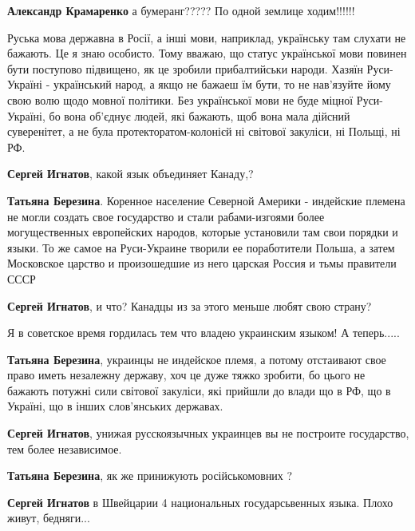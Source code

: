 \begin{itemize}
{\begin{itemize}
\textbf{Александр Крамаренко} а бумеранг????? По одной землице ходим!!!!!!

\end{itemize}


Руська мова державна в Росії, а інші мови, наприклад, українську там слухати не
бажають. Це я знаю особисто. Тому вважаю, що статус української мови повинен
бути поступово підвищено, як це зробили прибалтийськи народи. Хазяїн
Руси-Україні - український народ, а якщо не бажаеш їм бути, то не нав'язуйте
йому свою волю щодо мовної політики. Без української мови не буде міцної
Руси-Україні, бо вона об'єднує людей, які бажають, щоб вона мала дійсний
суверенітет, а не була протекторатом-колонієй ні світової закуліси, ні Польщі,
ні РФ.

\begin{itemize}

\textbf{Сергей Игнатов}, какой язык объединяет Канаду,?

\textbf{Татьяна Березина}. Коренное население Северной Америки - индейские
племена не могли создать свое государство и стали рабами-изгоями более
могущественных европейских народов, которые установили там свои порядки и
языки. То же самое на Руси-Украине творили ее поработители Польша, а затем
Московское царство и произошедшие из него царская Россия и тьмы правители СССР

\textbf{Сергей Игнатов}, и что? Канадцы из за этого меньше любят свою страну?

Я в советское время гордилась тем что владею украинским языком! А теперь.....

\textbf{Татьяна Березина}, украинцы не индейское племя, а потому отстаивают
свое право иметь незалежну державу, хоч це дуже тяжко зробити, бо цього не
бажають потужні сили світової закуліси, які прийшли до влади що в РФ, що в
Україні, що в інших слов'янських державах.

\textbf{Сергей Игнатов}, унижая русскоязычных украинцев вы не построите государство, тем более независимое.

\textbf{Татьяна Березина}, як же принижують російськомовних ?

\textbf{Сергей Игнатов} в Швейцарии 4 национальных государсьвенных языка. Плохо живут, бедняги...


\end{itemize}}
\end{itemize}
